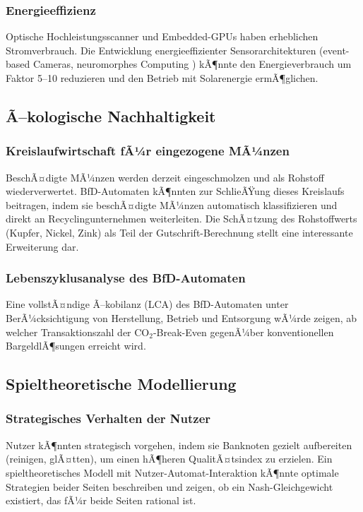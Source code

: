 ﻿\documentclass[a4paper,12pt]{article}
\theoremstyle{definition}
\begin{document}
\subsubsection{Energieeffizienz}

Optische Hochleistungsscanner und Embedded-GPUs haben erheblichen Stromverbrauch.
Die Entwicklung energieeffizienter Sensorarchitekturen (event-based Cameras,
neuromorphes Computing \cite{mahowald1992vlsi}) kÃ¶nnte den Energieverbrauch
um Faktor 5--10 reduzieren und den Betrieb mit Solarenergie ermÃ¶glichen.

\subsection{Ã–kologische Nachhaltigkeit}

\subsubsection{Kreislaufwirtschaft fÃ¼r eingezogene MÃ¼nzen}

BeschÃ¤digte MÃ¼nzen werden derzeit eingeschmolzen und als Rohstoff
wiederverwertet.  BfD-Automaten kÃ¶nnten zur SchlieÃŸung dieses Kreislaufs
beitragen, indem sie beschÃ¤digte MÃ¼nzen automatisch klassifizieren
und direkt an Recyclingunternehmen weiterleiten.
Die SchÃ¤tzung des Rohstoffwerts (Kupfer, Nickel, Zink) als Teil der
Gutschrift-Berechnung stellt eine interessante Erweiterung dar.

\subsubsection{Lebenszyklusanalyse des BfD-Automaten}

Eine vollstÃ¤ndige Ã–kobilanz (LCA) des BfD-Automaten unter BerÃ¼cksichtigung
von Herstellung, Betrieb und Entsorgung wÃ¼rde zeigen, ab welcher
Transaktionszahl der CO$_2$-Break-Even gegenÃ¼ber konventionellen
BargeldlÃ¶sungen erreicht wird.

\subsection{Spieltheoretische Modellierung}

\subsubsection{Strategisches Verhalten der Nutzer}

Nutzer kÃ¶nnten strategisch vorgehen, indem sie Banknoten gezielt aufbereiten
(reinigen, glÃ¤tten), um einen hÃ¶heren QualitÃ¤tsindex zu erzielen.
Ein spieltheoretisches Modell \cite{fudenberg1991game} mit Nutzer-Automat-Interaktion
kÃ¶nnte optimale Strategien beider Seiten beschreiben und zeigen,
ob ein Nash-Gleichgewicht existiert, das fÃ¼r beide Seiten rational ist.
\end{document}
